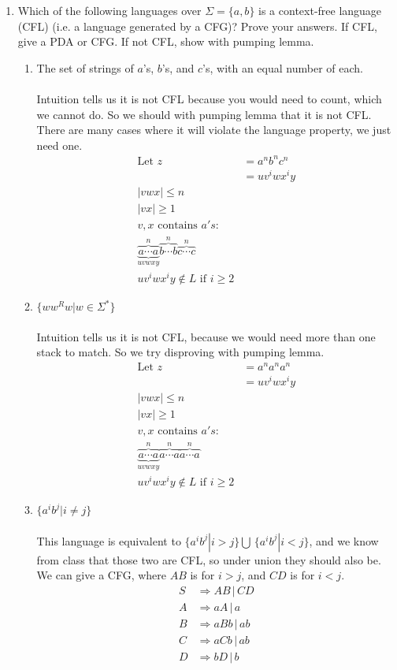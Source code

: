 \documentclass[10pt,a4paper,final]{article}
\begin{document}
\begin{enumerate}
\item %
Which of the following languages over $\Sigma = \{a,b\}$ is a context-free language (CFL)
(i.e. a language generated by a CFG)? Prove your answers.
If CFL, give a PDA or CFG. If not CFL, show with pumping lemma.
\begin{enumerate}
  \item %
  The set of strings of $a$'s, $b$'s, and $c$'s, with an equal number of each. \\
  \\
  Intuition tells us it is not CFL because you would need to count, which we cannot do.
  So we should with pumping lemma that it is not CFL.
  There are many cases where it will violate the language property, we just need one.
  \begin{align*}
    \mbox{Let } z &= a^n b^n c^n \\
    &= u v^i w x^i y \\
    |vwx| \leq n \\
    |vx| \geq 1 \\
    v,x \mbox{ contains } a's: \\
    \overbrace{\underbrace{a \cdots a}_{uvwxy}}^{n} \overbrace{b \cdots b}^{n} \overbrace{c \cdots c}^{n} \\
    u v^i w x^i y \notin L \mbox{ if } i \geq 2
  \end{align*}
  
  \item %
  $\{ww^Rw|w \in \Sigma^*\}$ \\
  \\
  Intuition tells us it is not CFL, because we would need more than one stack to match.
  So we try disproving with pumping lemma.
  \begin{align*}
    \mbox{Let } z &= a^n a^n a^n \\
    &= u v^i w x^i y \\
    |vwx| \leq n \\
    |vx| \geq 1 \\
    v,x \mbox{ contains } a's: \\
    \overbrace{\underbrace{a \cdots a}_{uvwxy}}^{n} \overbrace{a \cdots a}^{n} \overbrace{a \cdots a}^{n} \\
    u v^i w x^i y \notin L \mbox{ if } i \geq 2
  \end{align*}
  
  \item %
  $\{a^i b^j | i \neq j\}$ \\
  \\
  This language is equivalent to $\{a^i b^j | i > j\} \bigcup\, \{a^i b^j | i < j\}$, and
  we know from class that those two are CFL, so under union they should also be.
  We can give a CFG, where $AB$ is for $i > j$, and $CD$ is for $i < j$.
  \begin{align*}
    S &\Rightarrow AB \,|\, CD \\
    A &\Rightarrow aA \,|\, a \\
    B &\Rightarrow aBb \,|\, ab \\
    C &\Rightarrow aCb \,|\, ab \\
    D &\Rightarrow bD \,|\, b
  \end{align*}
  

\end{enumerate}
\end{enumerate}
\end{document}
